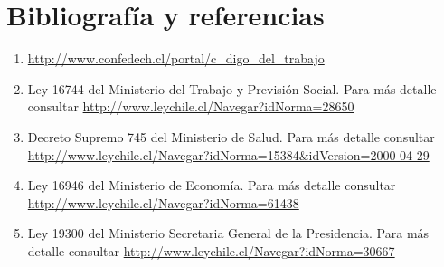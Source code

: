 \section{Bibliografía y referencias}

\begin{enumerate}
	\item \url{http://www.confedech.cl/portal/c_digo_del_trabajo}
	\item Ley 16744 del Ministerio del Trabajo y Previsión Social. Para más detalle
	      consultar \url{http://www.leychile.cl/Navegar?idNorma=28650}
	\item Decreto Supremo 745 del Ministerio de Salud. Para más detalle consultar
	      \url{http://www.leychile.cl/Navegar?idNorma=15384&idVersion=2000-04-29}
	\item Ley 16946 del Ministerio de Economía. Para más detalle consultar
	      \url{http://www.leychile.cl/Navegar?idNorma=61438}
	\item Ley 19300 del Ministerio Secretaria General de la Presidencia. Para más detalle consultar 
	      \url{http://www.leychile.cl/Navegar?idNorma=30667}
\end{enumerate}
